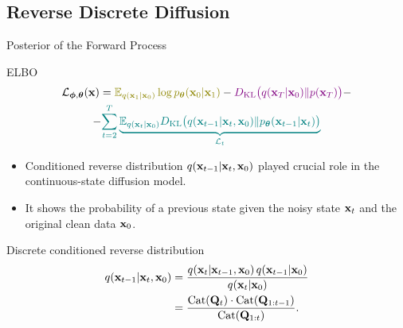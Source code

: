 \documentclass{beamer}
\begin{document}
\subsection{Reverse Discrete Diffusion}
\begin{frame}{Posterior of the Forward Process}
	\begin{block}{ELBO}
		\vspace{-0.7cm}
		\begin{multline*}
            \cL_{\bphi, \btheta}(\bx) =  {\color{olive}\bbE_{q(\bx_1 | \bx_0)} \log \pt(\bx_0 | \bx_1)} - {\color{violet}\KL\bigl(q(\bx_T | \bx_0) \| p(\bx_T)\bigr)} - \\
            - {\color{teal}\sum_{t=2}^T \underbrace{ \bbE_{q(\bx_t | \bx_0)} \KL \bigl(q(\bx_{t-1} | \bx_t, \bx_0) \| \pt(\bx_{t-1} | \bx_t)\bigr)}_{\cL_t}}
        \end{multline*}
		\vspace{-0.7cm}
	\end{block}
	\eqpause
	\begin{itemize}
		\item Conditioned reverse distribution $q(\mathbf{x}_{t-1} | \mathbf{x}_t, \mathbf{x}_0)$ played crucial role in the continuous-state diffusion model.
		\item It shows the probability of a previous state given the noisy state $\mathbf{x}_t$ and the original clean data $\mathbf{x}_0$.
	\end{itemize}
	\eqpause
	\begin{block}{Discrete conditioned reverse distribution}
		\vspace{-0.7cm}
		\begin{align*}
			q(\mathbf{x}_{t-1} | \mathbf{x}_t, \mathbf{x}_0)
			&= \frac{q(\mathbf{x}_t | \mathbf{x}_{t-1}, \mathbf{x}_0)\, q(\mathbf{x}_{t-1} | \mathbf{x}_0)}
			        {q(\mathbf{x}_t | \mathbf{x}_0)} \\
			&= \frac{\operatorname{Cat}(\mathbf{Q}_t) \cdot \operatorname{Cat}(\mathbf{Q}_{1:t-1})}{\operatorname{Cat}(\mathbf{Q}_{1:t})}.
		\end{align*}
	\end{block}
\end{frame}
\end{document}
